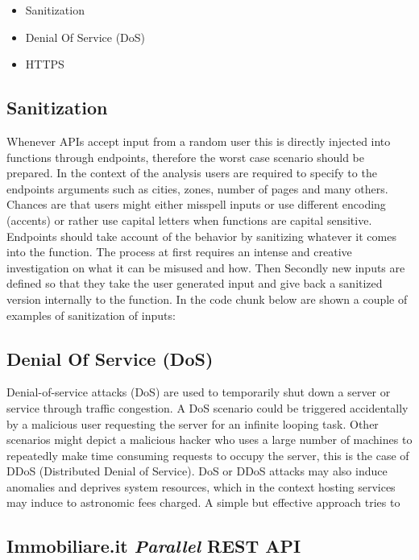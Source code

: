 \documentclass[
  12pt,
  a4paper,
  oneside]{book}
\providecommand{\tightlist}{%
  \setlength{\itemsep}{0pt}\setlength{\parskip}{0pt}}
\theoremstyle{definition}
\theoremstyle{definition}
\theoremstyle{definition}
\theoremstyle{remark}
\begin{document}
\begin{itemize}
\tightlist
\item
  Sanitization
\item
  Denial Of Service (DoS)
\item
  HTTPS
\end{itemize}

\hypertarget{sanitization}{%
\subsection{Sanitization}\label{sanitization}}

Whenever APIs accept input from a random user this is directly injected into functions through endpoints, therefore the worst case scenario should be prepared. In the context of the analysis users are required to specify to the endpoints arguments such as cities, zones, number of pages and many others. Chances are that users might either misspell inputs or use different encoding (accents) or rather use capital letters when functions are capital sensitive. Endpoints should take account of the behavior by sanitizing whatever it comes into the function. The process at first requires an intense and creative investigation on what it can be misused and how. Then Secondly new inputs are defined so that they take the user generated input and give back a sanitized version internally to the function. In the code chunk below are shown a couple of examples of sanitization of inputs:

\hypertarget{denial-of-service-dos}{%
\subsection{Denial Of Service (DoS)}\label{denial-of-service-dos}}

Denial-of-service attacks (DoS) are used to temporarily shut down a server or service through traffic congestion. A DoS scenario could be triggered accidentally by a malicious user requesting the server for an infinite looping task. Other scenarios might depict a malicious hacker who uses a large number of machines to repeatedly make time consuming requests to occupy the server, this is the case of DDoS (Distributed Denial of Service). DoS or DDoS attacks may also induce anomalies and deprives system resources, which in the context hosting services may induce to astronomic fees charged. A simple but effective approach tries to

\hypertarget{immobiliare.it-parallel-rest-api}{%
\subsection{\texorpdfstring{Immobiliare.it \emph{Parallel} REST API}{Immobiliare.it Parallel REST API}}\label{immobiliare.it-parallel-rest-api}}
\end{document}
